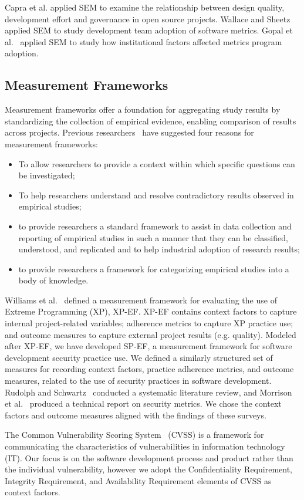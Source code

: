Capra et al. applied SEM to examine the relationship between design quality, development effort and governance in open source projects. Wallace and Sheetz~\cite{wallace2014adoption} applied SEM to study development team adoption of software metrics. Gopal et al.~\cite{gopal2005impact} applied SEM to study how institutional factors affected metrics program adoption.

\subsection{Measurement Frameworks}
Measurement frameworks offer a foundation for aggregating study results by standardizing the collection of empirical evidence, enabling comparison of results across projects. Previous researchers~\cite{kitchenham1999towards,williams2004toward} have suggested four reasons for measurement frameworks:
\begin{itemize}
	\item To allow researchers to provide a context within which specific questions can be investigated;
	\item To help researchers understand and resolve contradictory results observed in empirical studies;
	\item to provide researchers a standard framework to assist in data collection and reporting of empirical studies in such a manner that they can be classified, understood, and replicated and to help industrial adoption of research results;
	\item  to provide researchers a framework for categorizing empirical studies into a body of knowledge.
\end{itemize}

Williams et al.~\cite{williams2004toward} defined a measurement framework for evaluating the use of Extreme Programming (XP), XP-EF. XP-EF contains context factors to capture internal project-related variables; adherence metrics to capture XP practice use; and outcome measures to capture external project results (e.g. quality). Modeled after XP-EF, we have developed SP-EF, a measurement framework for software development security practice use. We defined a similarly structured set of measures for recording context factors, practice adherence metrics, and outcome measures, related to the use of security practices in software development.
Rudolph and Schwartz~\cite{rudolph2012critical} conducted a systematic literature review, and Morrison et al.~\cite{morrison2014mapping} produced a technical report on security metrics. We chose the context factors and outcome measures aligned with the findings of these surveys.

The Common Vulnerability Scoring System~\cite{mell2006common} (CVSS) is a framework for communicating the characteristics of vulnerabilities in information technology (IT). Our focus is on the software development process and product rather than the individual vulnerability, however we adopt the Confidentiality Requirement, Integrity Requirement, and Availability Requirement elements of CVSS as context factors.